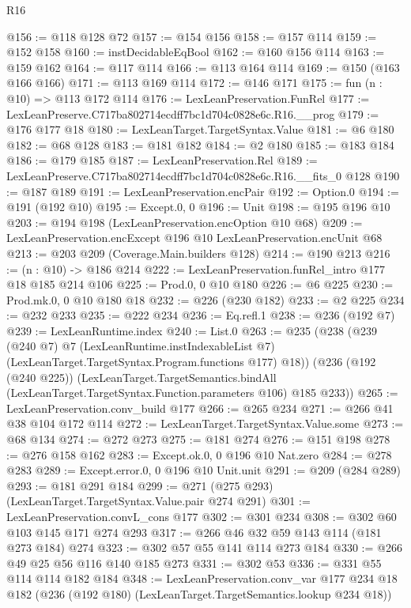 \begin{lexlean}{R16}
\begin{coremodule}
@156 := @118 @128 @72
@157 := @154 @156
@158 := @157 @114
@159 := @152 @158
@160 := instDecidableEqBool
@162 := @160 @156 @114
@163 := @159 @162
@164 := @117 @114
@166 := @113 @164 @114
@169 := @150 (@163 @166 @166)
@171 := @113 @169 @114
@172 := @146 @171
@175 := fun (n : @10) => @113 @172 @114
@176 := LexLeanPreservation.FunRel
@177 := LexLeanPreserve.C717ba802714ecdff7bc1d704c0828e6c.R16.__prog
@179 := @176 @177 @18
@180 := LexLeanTarget.TargetSyntax.Value
@181 := @6 @180
@182 := @68 @128
@183 := @181 @182
@184 := @2 @180
@185 := @183 @184
@186 := @179 @185
@187 := LexLeanPreservation.Rel
@189 := LexLeanPreserve.C717ba802714ecdff7bc1d704c0828e6c.R16.__fits_0 @128
@190 := @187 @189
@191 := LexLeanPreservation.encPair
@192 := Option.{0}
@194 := @191 (@192 @10)
@195 := Except.{0, 0}
@196 := Unit
@198 := @195 @196 @10
@203 := @194 @198 (LexLeanPreservation.encOption @10 @68)
@209 := LexLeanPreservation.encExcept @196 @10 LexLeanPreservation.encUnit @68
@213 := @203 @209 (Coverage.Main.builders @128)
@214 := @190 @213
@216 := (n : @10) -> @186 @214
@222 := LexLeanPreservation.funRel_intro @177 @18 @185 @214 @106
@225 := Prod.{0, 0} @10 @180
@226 := @6 @225
@230 := Prod.mk.{0, 0} @10 @180 @18
@232 := @226 (@230 @182)
@233 := @2 @225
@234 := @232 @233
@235 := @222 @234
@236 := Eq.refl.{1}
@238 := @236 (@192 @7)
@239 := LexLeanRuntime.index
@240 := List.{0}
@263 := @235
    (@238
      (@239
        (@240 @7)
        @7
        (LexLeanRuntime.instIndexableList @7)
        (LexLeanTarget.TargetSyntax.Program.functions @177)
        @18))
    (@236
      (@192 (@240 @225))
      (LexLeanTarget.TargetSemantics.bindAll
        (LexLeanTarget.TargetSyntax.Function.parameters @106)
        @185
        @233))
@265 := LexLeanPreservation.conv_build @177
@266 := @265 @234
@271 := @266 @41 @38 @104 @172 @114
@272 := LexLeanTarget.TargetSyntax.Value.some
@273 := @68 @134
@274 := @272 @273
@275 := @181 @274
@276 := @151 @198
@278 := @276 @158 @162
@283 := Except.ok.{0, 0} @196 @10 Nat.zero
@284 := @278 @283
@289 := Except.error.{0, 0} @196 @10 Unit.unit
@291 := @209 (@284 @289)
@293 := @181 @291 @184
@299 := @271 (@275 @293) (LexLeanTarget.TargetSyntax.Value.pair @274 @291)
@301 := LexLeanPreservation.convL_cons @177
@302 := @301 @234
@308 := @302 @60 @103 @145 @171 @274 @293
@317 := @266 @46 @32 @59 @143 @114 (@181 @273 @184) @274
@323 := @302 @57 @55 @141 @114 @273 @184
@330 := @266 @49 @25 @56 @116 @140 @185 @273
@331 := @302 @53
@336 := @331 @55 @114 @114 @182 @184
@348 := LexLeanPreservation.conv_var
    @177
    @234
    @18
    @182
    (@236 (@192 @180) (LexLeanTarget.TargetSemantics.lookup @234 @18))

\end{coremodule}
\end{lexlean}
